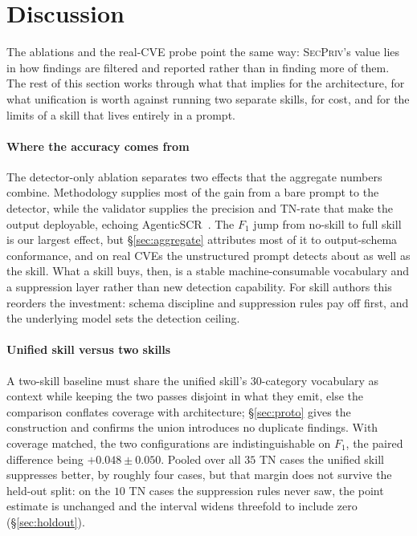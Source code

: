 \documentclass[runningheads]{llncs}
\begin{document}
\section{Discussion}\label{sec:discussion}

The ablations and the real-CVE probe point the same way: \textsc{SecPriv}'s value lies in how findings are filtered and reported rather than in finding more of them. The rest of this section works through what that implies for the architecture, for what unification is worth against running two separate skills, for cost, and for the limits of a skill that lives entirely in a prompt.

\paragraph{Where the accuracy comes from} The detector-only ablation separates two effects that the aggregate numbers combine. Methodology supplies most of the gain from a bare prompt to the detector, while the validator supplies the precision and TN-rate that make the output deployable, echoing AgenticSCR~\cite{charoenwet2026agenticscr}. The $F_1$ jump from no-skill to full skill is our largest effect, but \S\ref{sec:aggregate} attributes most of it to output-schema conformance, and on real CVEs the unstructured prompt detects about as well as the skill. What a skill buys, then, is a stable machine-consumable vocabulary and a suppression layer rather than new detection capability. For skill authors this reorders the investment: schema discipline and suppression rules pay off first, and the underlying model sets the detection ceiling.

\paragraph{Unified skill versus two skills}\label{sec:gap}

A two-skill baseline must share the unified skill's $30$-category vocabulary as context while keeping the two passes disjoint in what they emit, else the comparison conflates coverage with architecture; \S\ref{sec:proto} gives the construction and confirms the union introduces no duplicate findings. With coverage matched, the two configurations are indistinguishable on $F_1$, the paired difference being $+0.048\pm0.050$. Pooled over all $35$ TN cases the unified skill suppresses better, by roughly four cases, but that margin does not survive the held-out split: on the $10$ TN cases the suppression rules never saw, the point estimate is unchanged and the interval widens threefold to include zero (\S\ref{sec:holdout}).
\end{document}

